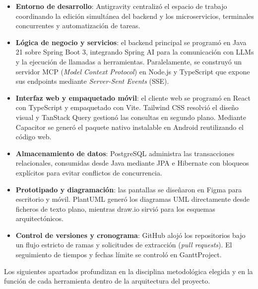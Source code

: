 \begin{itemize}
\item \textbf{Entorno de desarrollo}: Antigravity centralizó el espacio de trabajo coordinando la edición simultánea del backend y los microservicios, terminales concurrentes y automatización de tareas.
\item \textbf{Lógica de negocio y servicios}: el backend principal se programó en Java 21 sobre Spring Boot 3, integrando Spring AI para la comunicación con LLMs y la ejecución de llamadas a herramientas. Paralelamente, se construyó un servidor MCP (\emph{Model Context Protocol}) en Node.js y TypeScript que expone sus endpoints mediante \emph{Server-Sent Events} (SSE).
\item \textbf{Interfaz web y empaquetado móvil}: el cliente web se programó en React con TypeScript y empaquetado con Vite. Tailwind CSS resolvió el diseño visual y TanStack Query gestionó las consultas en segundo plano. Mediante Capacitor se generó el paquete nativo instalable en Android reutilizando el código web.
\item \textbf{Almacenamiento de datos}: PostgreSQL administra las transacciones relacionales, consumidas desde Java mediante JPA e Hibernate con bloqueos explícitos para evitar conflictos de concurrencia.
\item \textbf{Prototipado y diagramación}: las pantallas se diseñaron en Figma para escritorio y móvil. PlantUML generó los diagramas UML directamente desde ficheros de texto plano, mientras draw.io sirvió para los esquemas arquitectónicos.
\item \textbf{Control de versiones y cronograma}: GitHub alojó los repositorios bajo un flujo estricto de ramas y solicitudes de extracción (\emph{pull requests}). El seguimiento de tiempos y fechas límite se controló en GanttProject.
\end{itemize}

    Los siguientes apartados profundizan en la disciplina metodológica elegida y en la función de cada herramienta dentro de la arquitectura del proyecto.



